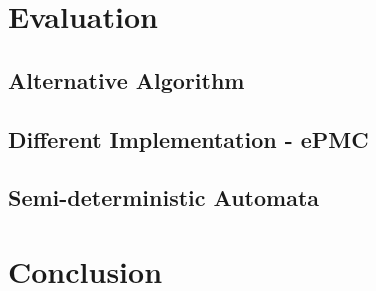 \documentclass[
	digital
nolof, nolot
]{fithesis3}
\begin{document}
	\chapter{Evaluation}
		\section{Alternative Algorithm}
		\section{Different Implementation - ePMC}
		\section{Semi-deterministic Automata}
	\chapter{Conclusion}
\end{document}
